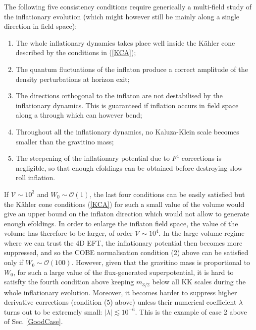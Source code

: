 \documentclass[11pt,a4paper]{article}
\newcommand{\ben}{\begin{enumerate}}
\newcommand{\een}{\end{enumerate}}
\newcommand\vo{{\mathcal{V}}}
\newcommand{\mc}{\mathcal}
\begin{document}
The following five consistency conditions require generically a multi-field study of the inflationary evolution (which might however still be mainly along a single direction in field space):
\ben
\item The whole inflationary dynamics takes place well inside the K\"ahler cone described by the conditions in (\ref{KCA});

\item The quantum fluctuations of the inflaton produce a correct amplitude of the density perturbations at horizon exit;

\item The directions orthogonal to the inflaton are not destabilised by the inflationary dynamics. This is guaranteed if inflation occurs in field space along a through which can however bend;

\item Throughout all the inflationary dynamics, no Kaluza-Klein scale becomes smaller than the gravitino mass;

\item The steepening of the inflationary potential due to $F^4$ corrections is negligible, so that enough efoldings can be obtained before destroying slow roll inflation.
\een
If $\vo\sim 10^3$ and $W_0\sim \mc{O}(1)$, the last four conditions can be easily satisfied but the K\"ahler cone conditions (\ref{KCA}) for such a small value of the volume would give an upper bound on the inflaton direction which would not allow to generate enough efoldings. In order to enlarge the inflaton field space, the value of the volume has therefore to be larger, of order $\vo \sim 10^4$. In the large volume regime where we can trust the 4D EFT, the inflationary potential then becomes more suppressed, and so the COBE normalisation condition (2) above can be satisfied only if $W_0\sim \mc{O}(100)$. However, given that the gravitino mass is proportional to $W_0$, for such a large value of the flux-generated superpotential, it is hard to satisfty the fourth condition above keeping $m_{3/2}$ below all KK scales during the whole inflationary evolution. Moreover, it becomes harder to suppress higher derivative corrections (condition (5) above) unless their numerical coefficient $\lambda$ turns out to be extremely small: $|\lambda|\lesssim 10^{-6}$. This is the example of case 2 above of Sec. \ref{GoodCase}.
\end{document}
